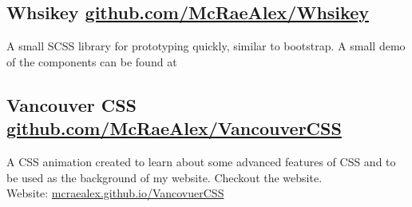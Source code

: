 \documentclass{article}
\newcommand{\hrefColored}[3]{\href{#2}{\color{#1}{#3}}}
\begin{document}
\subsection{Whsikey \href{https://github.com/McRaeAlex/Whiskey}{github.com/McRaeAlex/Whsikey}}

A small SCSS library for prototyping quickly, similar to bootstrap. A small demo
of the components can be found at 
\hrefColored{blue}{https://mcraealex.github.io/Whiskey}{https://mcraealex.github.io/Whiskey}

\subsection{Vancouver CSS  \href{https://github.com/McRaeAlex/VancouverCSS}{github.com/McRaeAlex/VancouverCSS}}

A CSS animation created to learn about some advanced features of CSS and to be 
used as the background of my website. Checkout the website.\\
\indent Website: \href{https://mcraealex.github.io/VancovuerCSS}{mcraealex.github.io/VancovuerCSS}
\end{document}
